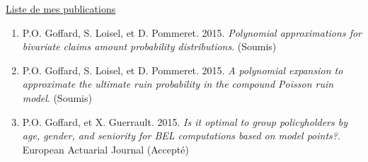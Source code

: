 \documentclass[a4paper,11pt]{article}
\begin{document}
\begin{center}
\Large \underline{Liste de mes publications}
\end{center}
\vspace{0.5cm}

\begin{enumerate}
\item
 P.O. Goffard, S. Loisel, et D. Pommeret. 2015. \textit{Polynomial approximations for bivariate claims amount probability distributions}. (Soumis)
\item
 P.O. Goffard, S. Loisel, et D. Pommeret. 2015. \textit{A polynomial expansion to approximate the ultimate ruin probability in the compound Poisson ruin model}. (Soumis)
\item
 P.O. Goffard, et X. Guerrault. 2015. \textit{Is it optimal to group policyholders by age, gender, and seniority for BEL computations based on model points?}. European Actuarial Journal (Accepté)
	\end{enumerate}
\end{document}

